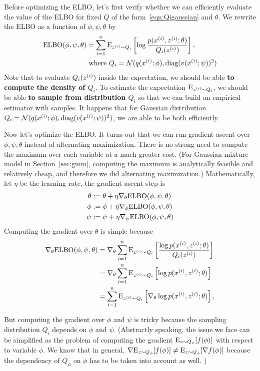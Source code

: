 \documentclass{article}
\begin{document}
Before optimizing the ELBO, let's first verify whether we can efficiently evaluate the value of the ELBO for fixed $Q$ of the form~\eqref{eqn:Qigaussian} and $\theta$. We rewrite the ELBO as a function of $\phi, \psi, \theta$ by 
\begin{align}
\textup{ELBO}(\phi,\psi,\theta) & = \sum_{i=1}^{{n}}{\rm E}_{{z^{(i)}} \sim Q_i}\left[\log \frac{p({x^{(i)}},{z^{(i)}};\theta)}{Q_i({z^{(i)}})}\right], \\
& \textup{ where } Q_i = \mathcal{N}(q({x^{(i)}};\phi), \textup{diag}(v({x^{(i)}};\psi))^2) \nonumber
\end{align}
Note that to evaluate $Q_i({z^{(i)}})$ inside the expectation, we should be able {\bf to compute the density of $Q_i$}. 
To estimate the expectation ${\rm E}_{{z^{(i)}} \sim Q_i}$, we should be able {\bf to sample from distribution $Q_i$} so that we can build an empirical estimator with samples.  It happens that for Gaussian distribution $ Q_i = \mathcal{N}(q({x^{(i)}};\phi), \textup{diag}(v({x^{(i)}};\psi))^2)$, we are able to be both efficiently. 

Now let's optimize the ELBO. It turns out that we can run gradient ascent over $\phi, \psi, \theta$ instead of alternating maximization. There is no strong need to compute the maximum over each variable at a much greater cost. (For Gaussian mixture model in Section~\ref{sec:gmm}, computing the maximum is analytically feasible and relatively cheap, and therefore we did alternating maximization.) Mathematically, let $\eta$ be the learning rate, the gradient ascent step is 
\begin{align}
\theta & : = \theta + \eta \nabla_\theta \textup{ELBO}(\phi,\psi,\theta)\nonumber \\
\phi & : = \phi + \eta \nabla_\phi \textup{ELBO}(\phi,\psi,\theta) \nonumber\\
\psi & : = \psi + \eta \nabla_\psi \textup{ELBO}(\phi,\psi,\theta) \nonumber
\end{align}
Computing the gradient over $\theta$ is simple because 
\begin{align}
 \nabla_\theta \textup{ELBO}(\phi,\psi,\theta) &=  \nabla_\theta \sum_{i=1}^{{n}}{\rm E}_{{z^{(i)}} \sim Q_i}\left[\frac{\log p({x^{(i)}},{z^{(i)}};\theta)}{Q_i({z^{(i)}})}\right] \nonumber \\
&=  \nabla_\theta \sum_{i=1}^{{n}}{\rm E}_{{z^{(i)}} \sim Q_i}\left[ \log p({x^{(i)}},{z^{(i)}};\theta)\right] \nonumber \\
&= \sum_{i=1}^{{n}}{\rm E}_{{z^{(i)}} \sim Q_i}\left[\nabla_\theta \log p({x^{(i)}},{z^{(i)}};\theta)\right],
\end{align}

But computing the gradient over $\phi$ and $\psi$ is tricky because the sampling distribution $Q_i$ depends on $\phi$ and $\psi$. (Abstractly speaking, the issue we face can be simplified as the problem of computing the gradient ${\rm E}_{z\sim Q_\phi}[f(\phi)]$ with respect to variable $\phi$. We know that in general, $\nabla {\rm E}_{z\sim Q_\phi}[f(\phi)] \neq {\rm E}_{z\sim Q_\phi}[\nabla f(\phi)]$ because the dependency of $Q_\phi$ on $\phi$ has to be taken into account as well. )
\end{document}
